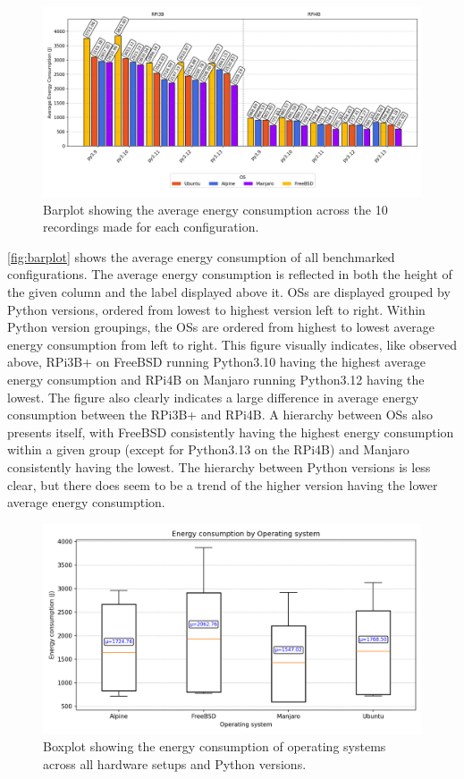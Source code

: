 \begin{figure}[H]
    \centering
    \includegraphics[width=\textwidth]{figures/consumption_barplot_all_pis.png}
    \caption{Barplot showing the average energy consumption across the 10 recordings made for each configuration.}
    \label{fig:barplot}
\end{figure}

\autoref{fig:barplot} shows the average energy consumption of all benchmarked configurations. The average energy consumption is reflected in both the height of the given column and the label displayed above it. OSs are displayed grouped by Python versions, ordered from lowest to highest version left to right. Within Python version groupings, the OSs are ordered from highest to lowest average energy consumption from left to right. This figure visually indicates, like observed above, RPi3B+ on FreeBSD running Python3.10 having the highest average energy consumption and RPi4B on Manjaro running Python3.12 having the lowest. The figure also clearly indicates a large difference in average energy consumption between the RPi3B+ and RPi4B. A hierarchy between OSs also presents itself, with FreeBSD consistently having the highest energy consumption within a given group (except for Python3.13 on the RPi4B) and Manjaro consistently having the lowest. The hierarchy between Python versions is less clear, but there does seem to be a trend of the higher version having the lower average energy consumption.

\begin{figure}[H]
    \centering
    \includegraphics[width=\textwidth]{figures/energy_boxplot_by_os.png}
    \caption{Boxplot showing the energy consumption of operating systems across all hardware setups and Python versions.}
    \label{fig:boxplot_os}
\end{figure}

